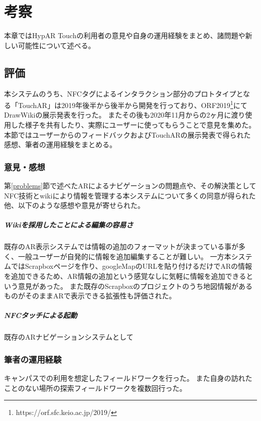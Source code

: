 \chapter{考察}
\label{chap:consideration}

本章ではHypAR Touchの利用者の意見や自身の運用経験をまとめ、諸問題や新しい可能性について述べる。

\newpage


\section{評価}
本システムのうち、NFCタグによるインタラクション部分のプロトタイプとなる「TouchAR」は2019年後半から後半から開発を行っており、ORF2019\footnote{ \textsf{https://orf.sfc.keio.ac.jp/2019/} }にてDrawWikiの展示発表を行った。
またその後も2020年11月からの2ヶ月に渡り使用した様子を共有したり、実際にユーザーに使ってもらうことで意見を集めた。
本節ではユーザーからのフィードバックおよびTouchARの展示発表で得られた感想、筆者の運用経験をまとめる。

\subsection{意見・感想}

第\ref{problems}節で述べたARによるナビゲーションの問題点や、その解決策としてNFC技術とwikiにより情報を管理する本システムについて多くの同意が得られた他、以下のような感想や意見が寄せられた。

\paragraph*{Wikiを採用したことによる編集の容易さ}
既存のAR表示システムでは情報の追加のフォーマットが決まっている事が多く、一般ユーザーが自発的に情報を追加編集することが難しい。
一方本システムではScrapboxページを作り、googleMapのURLを貼り付けるだけでARの情報を追加できるため、AR情報の追加という感覚なしに気軽に情報を追加できるという意見があった。
また既存のScrapboxのプロジェクトのうち地図情報があるものがそのままARで表示できる拡張性も評価された。

\paragraph*{NFCタッチによる起動}
既存のARナビゲーションシステムとして

\subsection{筆者の運用経験}
キャンパスでの利用を想定したフィールドワークを行った。
また自身の訪れたことのない場所の探索フィールドワークを複数回行った。


